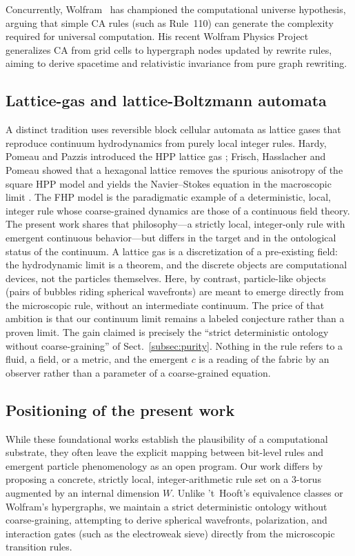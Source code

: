 \documentclass{ijuc}
\begin{document}
Concurrently, Wolfram~\cite{wolfram,wolfram2020physics} has championed the computational universe hypothesis, arguing that simple CA rules (such as Rule~110) can generate the complexity required for universal computation. His recent Wolfram Physics Project generalizes CA from grid cells to hypergraph nodes updated by rewrite rules, aiming to derive spacetime and relativistic invariance from pure graph rewriting. 

\subsection*{Lattice-gas and lattice-Boltzmann automata}
A distinct tradition uses reversible block cellular automata as lattice gases that reproduce continuum hydrodynamics from purely local integer rules.  Hardy, Pomeau and Pazzis introduced the HPP lattice gas \cite{hardy1976}; Frisch, Hasslacher and Pomeau showed that a hexagonal lattice removes the spurious anisotropy of the square HPP model and yields the Navier--Stokes equation in the macroscopic limit \cite{frisch1986}.  The FHP model is the paradigmatic example of a deterministic, local, integer rule whose coarse-grained dynamics are those of a continuous field theory.  The present work shares that philosophy---a strictly local, integer-only rule with emergent continuous behavior---but differs in the target and in the ontological status of the continuum.  A lattice gas is a discretization of a pre-existing field: the hydrodynamic limit is a theorem, and the discrete objects are computational devices, not the particles themselves.  Here, by contrast, particle-like objects (pairs of bubbles riding spherical wavefronts) are meant to emerge directly from the microscopic rule, without an intermediate continuum.  The price of that ambition is that our continuum limit remains a labeled conjecture rather than a proven limit.  The gain claimed is precisely the ``strict deterministic ontology without coarse-graining'' of Sect.~\ref{subsec:purity}.  Nothing in the rule refers to a fluid, a field, or a metric, and the emergent $c$ is a reading of the fabric by an observer rather than a parameter of a coarse-grained equation.

\subsection*{Positioning of the present work}
While these foundational works establish the plausibility of a computational substrate, they often leave the explicit mapping between bit-level rules and emergent particle phenomenology as an open program. Our work differs by proposing a concrete, strictly local, integer-arithmetic rule set on a 3-torus augmented by an internal dimension $W$. Unlike 't~Hooft's equivalence classes or Wolfram's hypergraphs, we maintain a strict deterministic ontology without coarse-graining, attempting to derive spherical wavefronts, polarization, and interaction gates (such as the electroweak sieve) directly from the microscopic transition rules.
\end{document}
